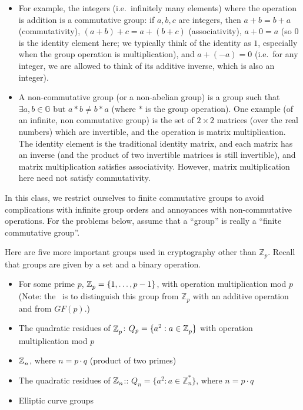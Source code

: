 \begin{itemize}
\item
  For example, the integers (i.e.~infinitely many elements) where the
  operation is addition is a commutative group: if \(a,b,c\) are
  integers, then \(a+b = b+a\) (commutativity), \((a+b)+c = a+(b+c)\)
  (associativity), \(a+0 = a\) (so \(0\) is the identity element here;
  we typically think of the identity as \(1\), especially when the group
  operation is multiplication), and \(a+(-a) = 0\) (i.e.~for any
  integer, we are allowed to think of its additive inverse, which is
  also an integer).
\item
  A non-commutative group (or a non-abelian group) is a group such that
  \(\exists a,b \in \mathbb{G}\) but \(a * b \neq b * a\) (where \(*\)
  is the group operation). One example (of an infinite, non commutative
  group) is the set of \(2 \times 2\) matrices (over the real numbers)
  which are invertible, and the operation is matrix multiplication. The
  identity element is the traditional identity matrix, and each matrix
  has an inverse (and the product of two invertible matrices is still
  invertible), and matrix multiplication satisfies associativity.
  However, matrix multiplication here need not satisfy commutativity.
\end{itemize}

In this class, we restrict ourselves to finite commutative groups to
avoid complications with infinite group orders and annoyances with
non-commutative operations. For the problems below, assume that a
``group'' is really a ``finite commutative group''.

Here are five more important groups used in cryptography other than
\(\mathbb{Z}_{p}\). Recall that groups are given by a set and a binary
operation.

\begin{itemize}
\tightlist
\item
  For some prime \(p\), \(\mathbb{Z}_p^{\*}=\{1,\ldots , p-1\}\), with
  operation multiplication mod \(p\) (Note: the \(^{\*}\) is to
  distinguish this group from \(\mathbb{Z}_p\) with an additive
  operation and from \(\ensuremath{\mathit{GF}}(p)\).)
\item
  The quadratic residues of \(\mathbb{Z}_p^{\*}\):
  \(Q_p=\{a^2:a\in \mathbb{Z}_p^{\*}\}\) with operation multiplication
  mod \(p\)
\item
  \(\mathbb{Z}_n^{\*}\), where \(n=p\cdot q\) (product of two primes)
\item
  The quadratic residues of \(\mathbb{Z}_n^{\*}\)::
  \(Q_n=\{a^2:a\in \mathbb{Z}_n^{*}\}\), where \(n=p\cdot q\)
\item
  Elliptic curve groups
\end{itemize}

